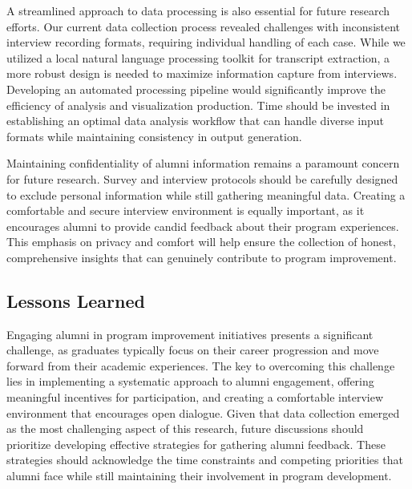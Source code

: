 \documentclass[12pt,a4paper]{article}
\begin{document}
A streamlined approach to data processing is also essential for future research efforts. Our current data collection process revealed challenges with inconsistent interview recording formats, requiring individual handling of each case. While we utilized a local natural language processing toolkit for transcript extraction, a more robust design is needed to maximize information capture from interviews. Developing an automated processing pipeline would significantly improve the efficiency of analysis and visualization production. Time should be invested in establishing an optimal data analysis workflow that can handle diverse input formats while maintaining consistency in output generation.


Maintaining confidentiality of alumni information remains a paramount concern for future research. Survey and interview protocols should be carefully designed to exclude personal information while still gathering meaningful data. Creating a comfortable and secure interview environment is equally important, as it encourages alumni to provide candid feedback about their program experiences. This emphasis on privacy and comfort will help ensure the collection of honest, comprehensive insights that can genuinely contribute to program improvement.

\subsection{Lessons Learned}
Engaging alumni in program improvement initiatives presents a significant challenge, as graduates typically focus on their career progression and move forward from their academic experiences. The key to overcoming this challenge lies in implementing a systematic approach to alumni engagement, offering meaningful incentives for participation, and creating a comfortable interview environment that encourages open dialogue. Given that data collection emerged as the most challenging aspect of this research, future discussions should prioritize developing effective strategies for gathering alumni feedback. These strategies should acknowledge the time constraints and competing priorities that alumni face while still maintaining their involvement in program development.
\end{document}
